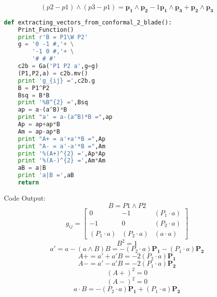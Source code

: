 \documentclass[10pt,fleqn]{report}
\newcommand{\W}{\wedge}
\begin{document}
\begin{equation*} (p2-p1)\W (p3-p1)=  \boldsymbol{p_{1}\wedge p_{2}} -1 \boldsymbol{p_{1}\wedge p_{3}} + \boldsymbol{p_{2}\wedge p_{3}} \end{equation*}
\begin{lstlisting}[language=Python,showspaces=false,showstringspaces=false,backgroundcolor=\color{gray},frame=single]
def extracting_vectors_from_conformal_2_blade():
    Print_Function()
    print r'B = P1\W P2'
    g = '0 -1 #,'+ \
        '-1 0 #,'+ \
        '# # #'
    c2b = Ga('P1 P2 a',g=g)
    (P1,P2,a) = c2b.mv()
    print 'g_{ij} =',c2b.g
    B = P1^P2
    Bsq = B*B
    print '%B^{2} =',Bsq
    ap = a-(a^B)*B
    print "a' = a-(a^B)*B =",ap
    Ap = ap+ap*B
    Am = ap-ap*B
    print "A+ = a'+a'*B =",Ap
    print "A- = a'-a'*B =",Am
    print '%(A+)^{2} =',Ap*Ap
    print '%(A-)^{2} =',Am*Am
    aB = a|B
    print 'a|B =',aB
    return
\end{lstlisting}
Code Output:
\begin{equation*} B = P1\W P2 \end{equation*}
\begin{equation*} g_{ij} = \left[\begin{matrix}0 & -1 & \left ( P_{1}\cdot a\right ) \\-1 & 0 & \left ( P_{2}\cdot a\right ) \\\left ( P_{1}\cdot a\right )  & \left ( P_{2}\cdot a\right )  & \left ( a\cdot a\right ) \end{matrix}\right] \end{equation*}
\begin{equation*} B^{2} = 1 \end{equation*}
\begin{equation*} a' = a-(a\W B) B = - \left ( P_{2}\cdot a\right )  \boldsymbol{P_{1}} - \left ( P_{1}\cdot a\right )  \boldsymbol{P_{2}} \end{equation*}
\begin{equation*} A+ = a'+a' B = - 2 \left ( P_{2}\cdot a\right )  \boldsymbol{P_{1}} \end{equation*}
\begin{equation*} A- = a'-a' B = - 2 \left ( P_{1}\cdot a\right )  \boldsymbol{P_{2}} \end{equation*}
\begin{equation*} (A+)^{2} = 0 \end{equation*}
\begin{equation*} (A-)^{2} = 0 \end{equation*}
\begin{equation*} a\cdot B = - \left ( P_{2}\cdot a\right )  \boldsymbol{P_{1}} + \left ( P_{1}\cdot a\right )  \boldsymbol{P_{2}} \end{equation*}
\end{document}
